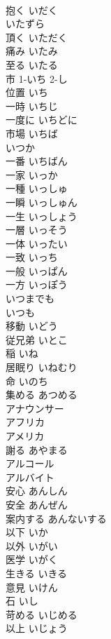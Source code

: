 \documentclass[8pt]{extreport}
\begin{document}
\begin{CJK}{UTF8}{min}
\\	抱く	いだく	
\\	いたずら		
\\	頂く	いただく	
\\	痛み	いたみ	
\\	至る	いたる	
\\	市	1-いち 2-し	
\\	位置	いち	
\\	一時	いちじ	
\\	一度に	いちどに	
\\	市場	いちば	
\\	いつか		
\\	一番	いちばん	
\\	一家	いっか	
\\	一種	いっしゅ	
\\	一瞬	いっしゅん	
\\	一生	いっしょう	
\\	一層	いっそう	
\\	一体	いったい	
\\	一致	いっち	
\\	一般	いっぱん	
\\	一方	いっぽう	
\\	いつまでも		
\\	いつも		
\\	移動	いどう	
\\	従兄弟	いとこ	
\\	稲	いね	
\\	居眠り	いねむり	
\\	命	いのち	
\\	集める	あつめる	
\\	アナウンサー		
\\	アフリカ		
\\	アメリカ		
\\	謝る	あやまる	
\\	アルコール		
\\	アルバイト		
\\	安心	あんしん	
\\	安全	あんぜん	
\\	案内する	あんないする	
\\	以下	いか	
\\	以外	いがい	
\\	医学	いがく	
\\	生きる	いきる	
\\	意見	いけん	
\\	石	いし	
\\	苛める	いじめる	
\\	以上	いじょう	

\end{CJK}
\end{document}
